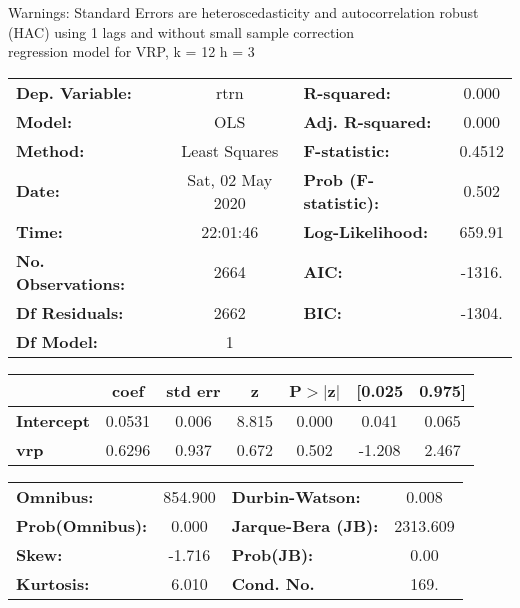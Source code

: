 Warnings: \newline
 [1] Standard Errors are heteroscedasticity and autocorrelation robust (HAC) using 1 lags and without small sample correction\\ 

regression model for VRP, k = 12 h = 3\begin{center}
\begin{tabular}{lclc}
\toprule
\textbf{Dep. Variable:}    &       rtrn       & \textbf{  R-squared:         } &     0.000   \\
\textbf{Model:}            &       OLS        & \textbf{  Adj. R-squared:    } &     0.000   \\
\textbf{Method:}           &  Least Squares   & \textbf{  F-statistic:       } &    0.4512   \\
\textbf{Date:}             & Sat, 02 May 2020 & \textbf{  Prob (F-statistic):} &    0.502    \\
\textbf{Time:}             &     22:01:46     & \textbf{  Log-Likelihood:    } &    659.91   \\
\textbf{No. Observations:} &        2664      & \textbf{  AIC:               } &    -1316.   \\
\textbf{Df Residuals:}     &        2662      & \textbf{  BIC:               } &    -1304.   \\
\textbf{Df Model:}         &           1      & \textbf{                     } &             \\
\bottomrule
\end{tabular}
\begin{tabular}{lcccccc}
                   & \textbf{coef} & \textbf{std err} & \textbf{z} & \textbf{P$> |$z$|$} & \textbf{[0.025} & \textbf{0.975]}  \\
\midrule
\textbf{Intercept} &       0.0531  &        0.006     &     8.815  &         0.000        &        0.041    &        0.065     \\
\textbf{vrp}       &       0.6296  &        0.937     &     0.672  &         0.502        &       -1.208    &        2.467     \\
\bottomrule
\end{tabular}
\begin{tabular}{lclc}
\textbf{Omnibus:}       & 854.900 & \textbf{  Durbin-Watson:     } &    0.008  \\
\textbf{Prob(Omnibus):} &   0.000 & \textbf{  Jarque-Bera (JB):  } & 2313.609  \\
\textbf{Skew:}          &  -1.716 & \textbf{  Prob(JB):          } &     0.00  \\
\textbf{Kurtosis:}      &   6.010 & \textbf{  Cond. No.          } &     169.  \\
\bottomrule
\end{tabular}
\end{center}

